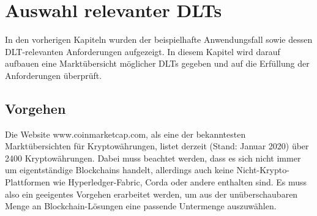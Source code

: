 \chapter{Auswahl relevanter DLTs}
\label{ch:dlt_selection}
In den vorherigen Kapiteln wurden der beispielhafte Anwendungsfall sowie dessen \ac{DLT}-relevanten Anforderungen aufgezeigt. In diesem Kapitel wird darauf aufbauen eine Marktübersicht möglicher \ac{DLT}s gegeben und auf die Erfüllung der Anforderungen überprüft.

%
%
\section{Vorgehen}
\label{sec:dlt_selection:approach}
Die Website www.coinmarketcap.com, als eine der bekanntesten Marktübersichten für Kryptowährungen, listet derzeit (Stand: Januar 2020) über 2400 Kryptowährungen. Dabei muss beachtet werden, dass es sich nicht immer um eigentständige Blockchains handelt, allerdings auch keine Nicht-Krypto-Plattformen wie Hyperledger-Fabric, Corda oder andere enthalten sind. Es muss also ein geeigentes Vorgehen erarbeitet werden, um aus der unüberschaubaren Menge an Blockchain-Lösungen eine passende Untermenge auszuwählen.

